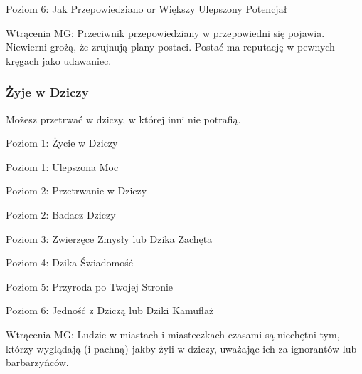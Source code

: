 Poziom 6: Jak Przepowiedziano or Większy Ulepszony Potencjał

Wtrącenia MG: Przeciwnik przepowiedziany w przepowiedni się pojawia. Niewierni grożą, że zrujnują plany postaci. Postać ma reputację w pewnych kręgach jako udawaniec. 

\subsubsection{Żyje w Dziczy}

Możesz przetrwać w dziczy, w której inni nie potrafią.

Poziom 1: Życie w Dziczy

Poziom 1: Ulepszona Moc

Poziom 2: Przetrwanie w Dziczy

Poziom 2: Badacz Dziczy

Poziom 3: Zwierzęce Zmysły lub Dzika Zachęta

Poziom 4: Dzika Świadomość

Poziom 5: Przyroda po Twojej Stronie

Poziom 6: Jedność z Dziczą lub Dziki Kamuflaż 

Wtrącenia MG: Ludzie w miastach i miasteczkach czasami są niechętni tym, którzy wyglądają (i pachną) jakby żyli w dziczy, uważając ich za ignorantów lub barbarzyńców.
